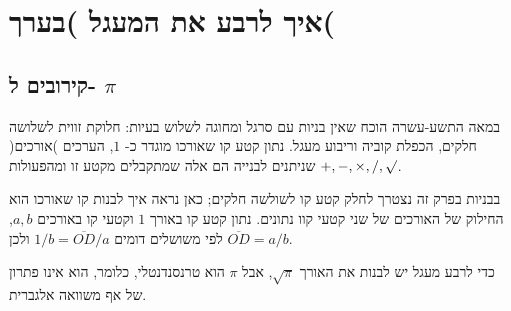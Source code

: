 
\chapter{%
איך לרבע את המעגל )בערך(}

\section{
קירובים ל-%
$\pi$}\label{s.square-intro}

במאה התשע-עשרה הוכח שאין בניות עם סרגל ומחוגה לשלוש בעיות: חלוקת זווית לשלושה חלקים, הכפלת קוביה וריבוע מעגל. נתון קטע קו שאורכו מוגדר כ-%
$1$,
הערכים )אורכים( שניתנים לבנייה הם אלה שמתקבלים מקטע זו ומהפעולות 
$+,-,\times,/,\surd$.

בבניות בפרק זה נצטרך לחלק קטע קו לשולשה חלקים; כאן נראה איך לבנות קו שאורכו הוא החילוק של האורכים של שני קטעי קוו נתונים. נתון קטע קו באורך 
$1$
וקטעי קו באורכים 
$a,b$,
לפי משושלים דומים
$1/b=\overline{OD}/a$
ולכן
$\overline{OD}=a/b$.

\begin{center}
\end{center}

כדי לרבע מעגל יש לבנות את האורך 
$\sqrt{\pi}$,
אבל
$\pi$
הוא טרנסנדנטלי, כלומר, הוא אינו פתרון של אף משוואה אלגברית.

